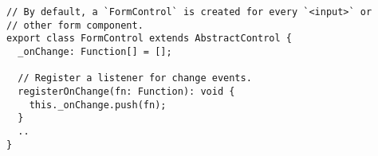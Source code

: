 \begin{verbatim}
// By default, a `FormControl` is created for every `<input>` or
// other form component.
export class FormControl extends AbstractControl {
  _onChange: Function[] = [];

  // Register a listener for change events.
  registerOnChange(fn: Function): void {
    this._onChange.push(fn);
  }
  ..
}
\end{verbatim}
